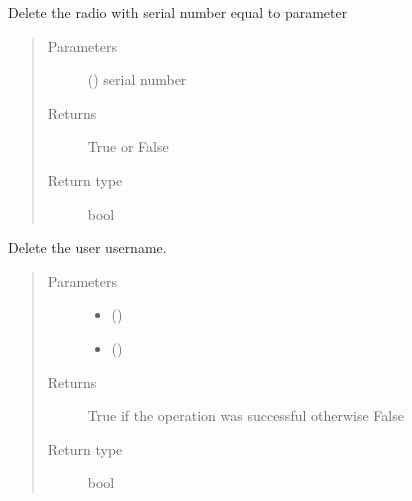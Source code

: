 \documentclass[letterpaper,10pt,english]{sphinxmanual}
\begin{document}

\begin{fulllineitems}
\label{\detokenize{index:controller.utility.delete_radio}}
Delete the radio with serial number equal to parameter
\begin{quote}\begin{description}
\item[{Parameters}] \leavevmode
{} () \textendash{} serial number

\item[{Returns}] \leavevmode
True or False

\item[{Return type}] \leavevmode
bool

\end{description}\end{quote}

\end{fulllineitems}


\begin{fulllineitems}
\label{\detokenize{index:controller.utility.delete_user}}
Delete the user username.
\begin{quote}\begin{description}
\item[{Parameters}] \leavevmode\begin{itemize}
\item {} 
 () \textendash{} 

\item {} 
 () \textendash{} 

\end{itemize}

\item[{Returns}] \leavevmode
True if the operation was successful otherwise False

\item[{Return type}] \leavevmode
bool

\end{description}\end{quote}

\end{fulllineitems}
\end{document}
